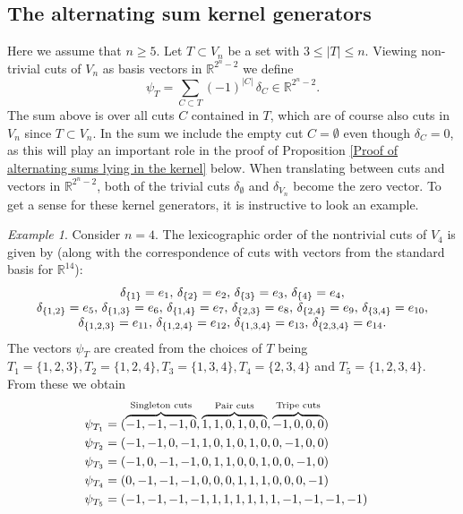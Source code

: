 \documentclass[12pt]{amsart}
\numberwithin{theorem}{section}
\theoremstyle{remark}
\newtheorem{example}[theorem]{Example}
\begin{document}
\subsection{The alternating sum kernel generators}
Here we assume that $n\ge 5$. Let $T\subset V_n$ be a set with $3\le |T| \le n$. Viewing non-trivial cuts of $V_n$ as basis vectors in $\mathbb R^{2^n-2}$ we define 
\begin{equation} \label{The alternating sum generators of the kernel of the full cut matrix}
\psi_T = \sum _{C\subset T} (-1)^{|C|}\, \delta_C \in \mathbb R^{2^n-2}. 
\end{equation} 
The sum above is over all cuts $C$ contained in $T$, which are of course also cuts in $V_n$ since $T\subset V_n$. In the sum we include the empty cut $C=\emptyset$ even though $\delta_C =  0$, as this will play an important role in the proof of Proposition \ref{Proof of alternating sums lying in the kernel} below. When translating between cuts and vectors in $\mathbb R^{2^n-2}$, both of the trivial cuts $\delta_{\emptyset}$ and $\delta_{V_n}$ become the zero vector. To get a sense for these kernel generators, it is instructive to look an example. 
\begin{example} \label{Example for n=4 and the symmetric kernel generators}
Consider $n=4$. The lexicographic order of the nontrivial cuts of $V_4$ is given by (along with the correspondence of cuts with vectors from the standard basis for $\mathbb R^{14}$):
$$\begin{array}{c}
\delta_{\{1\}} = e_1, \, \delta_{\{2\}}=e_2, \, \delta_{\{3\}}=e_3, \, \delta_{\{4\}}=e_4, \cr 
\delta_{\{1, 2\}}=e_5, \, \delta_{\{1, 3\}}=e_6, \, \delta_{\{1, 4\}}=e_7, \, \delta_{\{2, 3\}}=e_8,  \, \delta_{\{2, 4\}}=e_9, \, \delta_{\{3, 4\}}=e_{10},\cr  
\delta_{\{1, 2, 3\}}=e_{11}, \, \delta_{\{1, 2, 4\}}=e_{12}, \, \delta_{\{1, 3, 4\}}=e_{13}, \, \delta_{\{2, 3, 4\}}=e_{14}.
\end{array}$$
The vectors $\psi_T$ are created from the choices of $T$ being $T_1=\{1,2,3\}, T_2=\{1,2,4\}, T_3=\{1,3,4\}, T_4=\{2,3,4\}$ and $T_5=\{1,2,3,4\}$. From these we obtain
\begin{align*}
\psi_{T_1} & = (\overbrace{-1,-1,-1,0}^{\text{Singleton cuts}},\overbrace{1, 1, 0, 1, 0, 0}^{\text{Pair cuts}}, \overbrace{-1, 0,0,0}^{\text{Tripe cuts}})\cr
\psi_{T_2} & = (-1,-1,0,-1,1, 0, 1, 0, 1, 0, 0,-1,0,0)\cr
\psi_{T_3} & = (-1,0,-1,-1,0, 1, 1, 0,0,1, 0,0,-1,0)\cr
\psi_{T_4} & = (0,-1,-1,-1,0,0,0,1,1,1,0,0,0,-1)\cr
\psi_{T_5} & = (-1,-1,-1,-1,1,1,1,1,1,1,-1,-1,-1,-1)
\end{align*}
\end{example}
\end{document}
